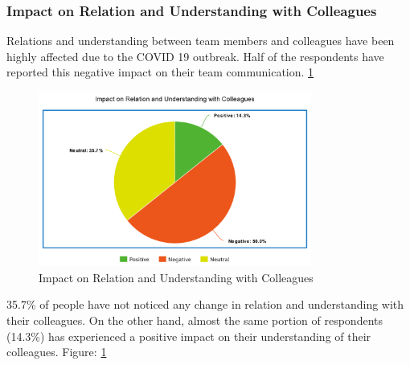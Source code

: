 \documentclass[11pt]{article}
\begin{document}
\subsubsection{Impact on Relation and Understanding with Colleagues}
Relations and understanding between team members and colleagues have been highly affected due to the COVID 19 outbreak. Half of the respondents have reported this negative impact on their team communication. \ref{Relation Colleagues}
\begin{figure}[!ht]
	\centering
	\includegraphics[width=0.8\textwidth]{Images/Collaboration/Relation Colleagues.png}
	\caption{Impact on Relation and Understanding with Colleagues}
	\centering
	\label{Relation Colleagues}
\end{figure}
 35.7\% of people have not noticed any change in relation and understanding with their colleagues. On the other hand, almost the same portion of respondents (14.3\%)  has experienced a positive impact on their understanding of their colleagues. Figure: \ref{Relation Colleagues}
\end{document}
